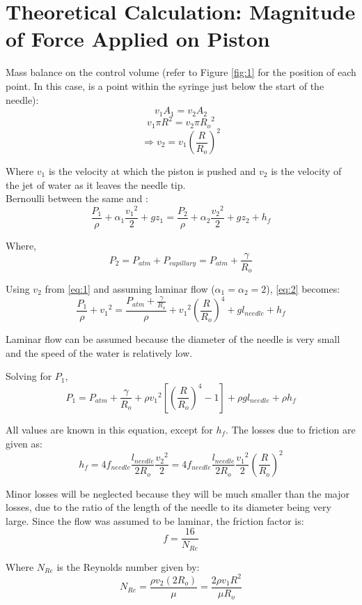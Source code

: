 \documentclass{article}
\newcommand*\circled[1]{\tikz[baseline=(char.base)]{
            \node[shape=circle,draw,inner sep=2pt] (char) {#1};}}
\begin{document}
\section{Theoretical Calculation: Magnitude of Force Applied on Piston}

Mass balance on the control volume (refer to Figure \ref{fig:1} for the position of each point. In this case, \circled{1} is a point within the syringe just below the start of the needle):
\[ v_{1}A_{1} = v_{2}A_{2} \]
\[ v_{1}\pi{R}^2 = v_{2}\pi{R_{o}}^2 \]
\[ \Rightarrow v_{2} = v_{1} \left(\frac{R}{R_{o}}\right)^2 \tag{1} \label{eq:1} \]

Where $v_{1}$ is the velocity at which the piston is pushed and $v_{2}$ is the velocity of the jet of water as it leaves the needle tip. \\

Bernoulli between the same \circled{1} and \circled{2} :
\[ \frac{P_{1}}{\rho} + \alpha_{1}\frac{{v_{1}}^2}{2}  + gz_{1} = \frac{P_{2}}{\rho} + \alpha_{2}\frac{{v_{2}}^2}{2}  + gz_{2} + h_{f} \tag{2} \label{eq:2} \]

Where,
\[ P_{2} = P_{atm} + P_{capillary}  = P_{atm} + \frac{\gamma}{R_{o}} \]


Using $v_{2}$ from \eqref{eq:1} and assuming laminar flow ($\alpha_{1} = \alpha_{2} = 2$), \eqref{eq:2} becomes:
\[ \frac{P_{1}}{\rho} + {v_{1}}^2 = \frac{P_{atm} + \frac{\gamma}{R_{o}}}{\rho} + {v_{1}}^2\left(\frac{R}{R_{o}}\right)^4  + gl_{needle} + h_{f} \]

Laminar flow can be assumed because the diameter of the needle is very small and the speed of the water is relatively low.

Solving for $P_{1}$,
\[ P_{1} = P_{atm} + \frac{\gamma}{R_{o}} + \rho{v_{1}}^2\left[\left(\frac{R}{R_{o}}\right)^4  - 1 \right] + \rho gl_{needle} + \rho h_{f} \tag{3} \label{eq:3} \]

All values are known in this equation, except for $h_{f}$. The losses due to friction are given as:
\[ h_{f} = 4f_{needle} \frac{l_{needle}}{2R_{o}} \frac{{v_{2}}^2}{2} = 4f_{needle} \frac{l_{needle}}{2R_{o}} \frac{{v_{1}}^2}{2} \left(\frac{R}{R_{o}}\right)^2 \tag{4} \label{eq:4} \]

Minor losses will be neglected because they will be much smaller than the major losses, due to the ratio of the length of the needle to its diameter being very large. Since the flow was assumed to be laminar, the friction factor is:
\[ f = \frac{16}{N_{Re}} \tag{5} \label{eq:5} \]

Where $N_{Re}$ is the Reynolds number given by:
\[ N_{Re} = \frac{\rho v_{2} (2R_{o})}{\mu} = \frac{2 \rho v_{1} R^{2}}{\mu R_{o}} \tag{6} \label{eq:6} \]
\end{document}
